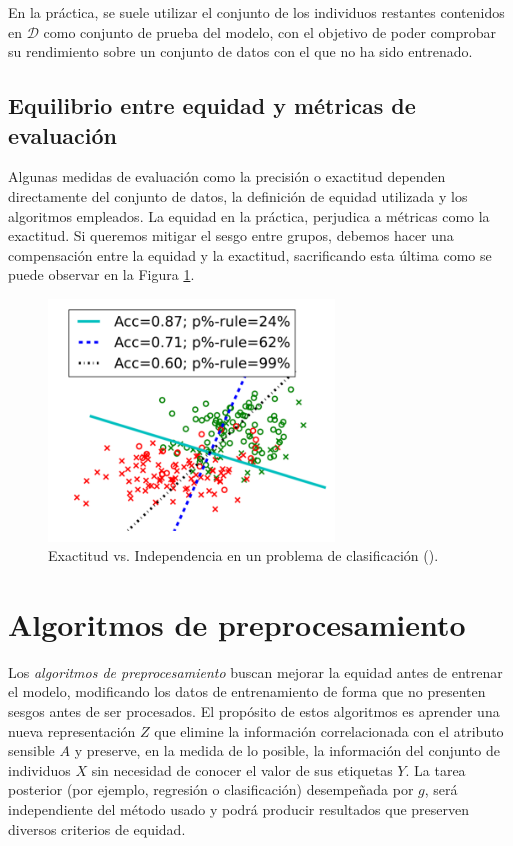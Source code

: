 \documentclass[oneside,openright,titlepage,numbers=noenddot,openany,headinclude,footinclude=true,
cleardoublepage=empty,abstractoff,BCOR=5mm,paper=a4,fontsize=12pt,main=spanish]{scrreprt}
\begin{document}
En la práctica, se suele utilizar el conjunto de los individuos restantes contenidos en $\mathcal{D}$ como conjunto de prueba del modelo, con el objetivo de poder comprobar su rendimiento sobre un conjunto de datos con el que no ha sido entrenado. 

\subsection{Equilibrio entre equidad y métricas de evaluación}

Algunas medidas de evaluación como la precisión o exactitud dependen directamente del conjunto de datos, la definición de equidad utilizada y los algoritmos empleados. La equidad en la práctica, perjudica a métricas como la exactitud. Si queremos mitigar el sesgo entre grupos, debemos hacer una compensación entre la equidad y la exactitud, sacrificando esta última como se puede observar en la Figura \ref{fig:tradeoff}.\\

\begin{figure}[h]
	\centering
	\includegraphics[width=7.6cm]{accuracyeq.png}
	\caption{Exactitud vs. Independencia en un problema de clasificación (\cite{constraints2017}).}
    \label{fig:tradeoff}
\end{figure}

\section{Algoritmos de preprocesamiento}

Los \textit{algoritmos de preprocesamiento} buscan mejorar la equidad antes de entrenar el modelo, modificando los datos de entrenamiento de forma que no presenten sesgos antes de ser procesados. El propósito de estos algoritmos es aprender una nueva representación $Z$ que elimine la información correlacionada con el atributo sensible $A$ y preserve, en la medida de lo posible, la información del conjunto de individuos $X$ sin necesidad de conocer el valor de sus etiquetas $Y$. La tarea posterior (por ejemplo, regresión o clasificación) desempeñada por $g$, será independiente del método usado y podrá producir resultados que preserven diversos criterios de equidad.\\
\end{document}
